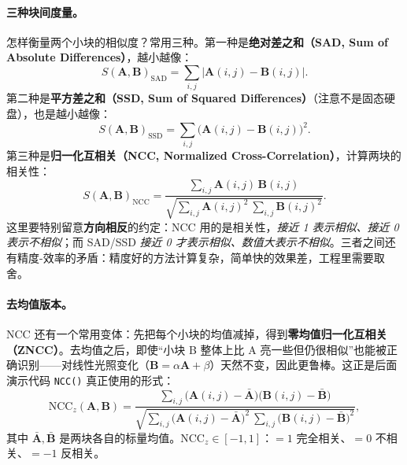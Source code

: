 \paragraph{三种块间度量。}
怎样衡量两个小块的相似度？常用三种\cite{gaoxiang2019slam14}。第一种是\textbf{绝对差之和（SAD, Sum of Absolute Differences）}，越小越像：
\begin{equation}
  S(\mathbf{A},\mathbf{B})_{\mathrm{SAD}}=\sum_{i,j}\bigl|\mathbf{A}(i,j)-\mathbf{B}(i,j)\bigr|.
  \label{eq:dense-sad}
\end{equation}
第二种是\textbf{平方差之和（SSD, Sum of Squared Differences）}（注意不是固态硬盘），也是越小越像：
\begin{equation}
  S(\mathbf{A},\mathbf{B})_{\mathrm{SSD}}=\sum_{i,j}\bigl(\mathbf{A}(i,j)-\mathbf{B}(i,j)\bigr)^2.
  \label{eq:dense-ssd}
\end{equation}
第三种是\textbf{归一化互相关（NCC, Normalized Cross-Correlation）}，计算两块的相关性：
\begin{equation}
  S(\mathbf{A},\mathbf{B})_{\mathrm{NCC}}=\frac{\displaystyle\sum_{i,j}\mathbf{A}(i,j)\,\mathbf{B}(i,j)}{\sqrt{\displaystyle\sum_{i,j}\mathbf{A}(i,j)^2\ \sum_{i,j}\mathbf{B}(i,j)^2}}.
  \label{eq:dense-ncc}
\end{equation}
这里要特别留意\textbf{方向相反}的约定：NCC 用的是相关性，\emph{接近 1 表示相似、接近 0 表示不相似}；而 SAD/SSD \emph{接近 0 才表示相似、数值大表示不相似}。三者之间还有精度-效率的矛盾：精度好的方法计算复杂，简单快的效果差，工程里需要取舍。

\paragraph{去均值版本。}
NCC 还有一个常用变体：先把每个小块的均值减掉，得到\textbf{零均值归一化互相关（ZNCC）}。去均值之后，即使“小块 B 整体上比 A 亮一些但仍很相似”也能被正确识别——对线性光照变化（$\mathbf{B}=\alpha\mathbf{A}+\beta$）天然不变，因此更鲁棒。这正是后面演示代码 \texttt{NCC()} 真正使用的形式：
\begin{equation}
  \mathrm{NCC}_z(\mathbf{A},\mathbf{B})=\frac{\displaystyle\sum_{i,j}\bigl(\mathbf{A}(i,j)-\bar{\mathbf{A}}\bigr)\bigl(\mathbf{B}(i,j)-\bar{\mathbf{B}}\bigr)}{\sqrt{\displaystyle\sum_{i,j}\bigl(\mathbf{A}(i,j)-\bar{\mathbf{A}}\bigr)^2\ \sum_{i,j}\bigl(\mathbf{B}(i,j)-\bar{\mathbf{B}}\bigr)^2}},
  \label{eq:dense-zncc}
\end{equation}
其中 $\bar{\mathbf{A}},\bar{\mathbf{B}}$ 是两块各自的标量均值。$\mathrm{NCC}_z\in[-1,1]$：$=1$ 完全相关、$=0$ 不相关、$=-1$ 反相关。

